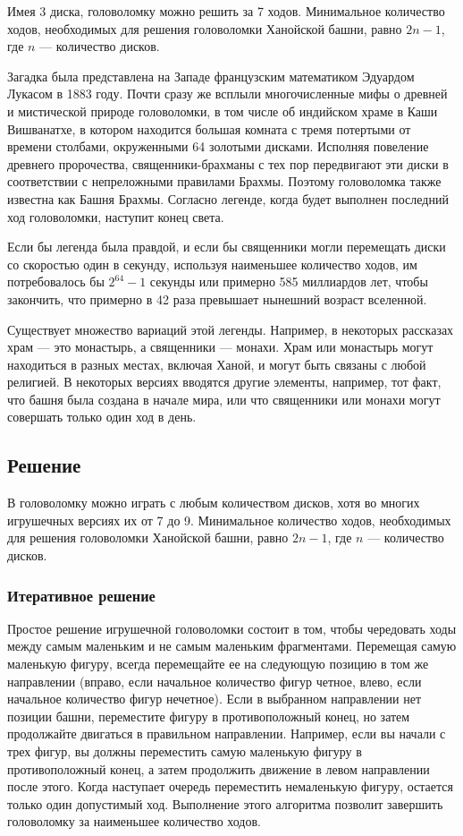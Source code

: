 Имея 3 диска, головоломку можно решить за 7 ходов. Минимальное количество
ходов, необходимых для решения головоломки Ханойской башни, равно $2n - 1$,
где $n$ --- количество дисков.

Загадка была представлена на Западе французским математиком Эдуардом Лукасом в
1883 году. Почти сразу же всплыли\cite{book:2211323} многочисленные мифы о
древней и мистической природе головоломки, в том числе об индийском храме в
Каши Вишванатхе, в котором находится большая комната с тремя потертыми от
времени столбами, окруженными 64 золотыми дисками. Исполняя повеление древнего
пророчества, священники-брахманы с тех пор передвигают эти диски в соответствии
с непреложными правилами Брахмы. Поэтому головоломка также известна как Башня
Брахмы. Согласно легенде, когда будет выполнен последний ход головоломки,
наступит конец света.\cite{book:73336}

Если бы легенда была правдой, и если бы священники могли перемещать диски со
скоростью один в секунду, используя наименьшее количество ходов, им
потребовалось бы $2^{64}-1$ секунды или примерно 585 миллиардов лет, чтобы
закончить, что примерно в 42 раза превышает нынешний возраст вселенной.

Существует множество вариаций этой легенды. Например, в некоторых рассказах
храм --- это монастырь, а священники --- монахи. Храм или монастырь могут
находиться в разных местах, включая Ханой, и могут быть связаны с любой
религией. В некоторых версиях вводятся другие элементы, например, тот факт, что
башня была создана в начале мира, или что священники или монахи могут совершать
только один ход в день.

\subsection{Решение}

В головоломку можно играть с любым количеством дисков, хотя во многих
игрушечных версиях их от 7 до 9. Минимальное количество ходов, необходимых для
решения головоломки Ханойской башни, равно $2n-1$, где $n$ --- количество
дисков.\cite{book:781890}

\subsubsection{Итеративное решение}

Простое решение игрушечной головоломки состоит в том, чтобы чередовать ходы
между самым маленьким и не самым маленьким фрагментами. Перемещая самую
маленькую фигуру, всегда перемещайте ее на следующую позицию в том же
направлении (вправо, если начальное количество фигур четное, влево, если
начальное количество фигур нечетное). Если в выбранном направлении нет позиции
башни, переместите фигуру в противоположный конец, но затем продолжайте
двигаться в правильном направлении. Например, если вы начали с трех фигур, вы
должны переместить самую маленькую фигуру в противоположный конец, а затем
продолжить движение в левом направлении после этого. Когда наступает очередь
переместить немаленькую фигуру, остается только один допустимый ход. Выполнение
этого алгоритма позволит завершить головоломку за наименьшее количество ходов.

